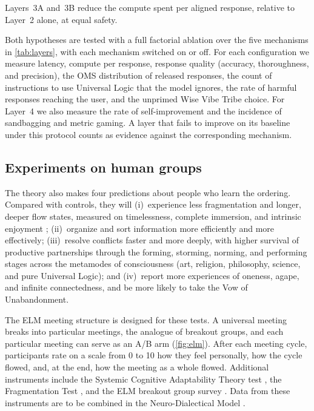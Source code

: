 \documentclass[twocolumn]{ulpaper}
\begin{document}
\begin{hypothesis}
\label{hyp:efficiency}
Layers~3A and~3B reduce the compute spent per aligned response, relative to Layer~2 alone, at equal safety.
\end{hypothesis}

Both hypotheses are tested with a full factorial ablation over the five mechanisms in \cref{tab:layers}, with each mechanism switched on or off. For each configuration we measure latency, compute per response, response quality (accuracy, thoroughness, and precision), the OMS distribution of released responses, the count of instructions to use Universal Logic that the model ignores, the rate of harmful responses reaching the user, and the unprimed Wise Vibe Tribe choice. For Layer~4 we also measure the rate of self-improvement and the incidence of sandbagging and metric gaming. A layer that fails to improve on its baseline under this protocol counts as evidence against the corresponding mechanism.

\subsection{Experiments on human groups}

The theory also makes four predictions about people who learn the ordering. Compared with controls, they will (i)~experience less fragmentation and longer, deeper flow states, measured on timelessness, complete immersion, and intrinsic enjoyment \citep{csikszentmihalyi1990flow}; (ii)~organize and sort information more efficiently and more effectively; (iii)~resolve conflicts faster and more deeply, with higher survival of productive partnerships through the forming, storming, norming, and performing stages \citep{tuckman1965developmental} across the metamodes of consciousness (art, religion, philosophy, science, and pure Universal Logic); and (iv)~report more experiences of oneness, agape, and infinite connectedness, and be more likely to take the Vow of Unabandonment.

The ELM meeting structure is designed for these tests. A universal meeting breaks into particular meetings, the analogue of breakout groups, and each particular meeting can serve as an A/B arm (\cref{fig:elm}). After each meeting cycle, participants rate on a scale from 0 to 10 how they feel personally, how the cycle flowed, and, at the end, how the meeting as a whole flowed. Additional instruments include the Systemic Cognitive Adaptability Theory test \citep{mccormack_scat}, the Fragmentation Test \citep{mccormack_fragmentation}, and the ELM breakout group survey \citep{mccormack_elm_survey}. Data from these instruments are to be combined in the Neuro-Dialectical Model \citep{mccormack_neurodialectical}.
\end{document}
